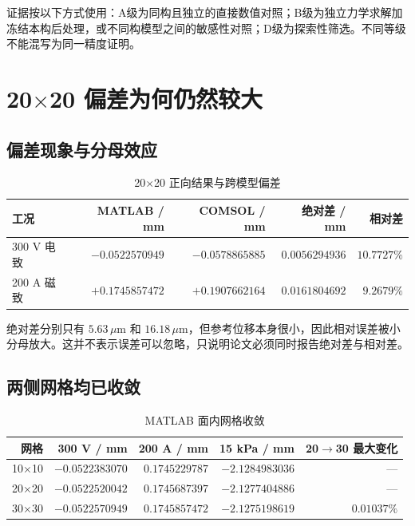 \documentclass[UTF8,fontset=windows,11pt,a4paper]{ctexart}
\begin{document}
证据按以下方式使用：A级为同构且独立的直接数值对照；B级为独立力学求解加冻结本构后处理，或不同构模型之间的敏感性对照；D级为探索性筛选。不同等级不能混写为同一精度证明。

\section{20$\times$20 偏差为何仍然较大}

\subsection{偏差现象与分母效应}

\begin{table}[H]
\centering
\caption{20$\times$20 正向结果与跨模型偏差}
\small
\begin{tabular}{lrrrr}
\toprule
工况 & MATLAB / mm & COMSOL / mm & 绝对差 / mm & 相对差 \\
\midrule
300 V 电致 & $-0.0522570949$ & $-0.0578865885$ & $0.0056294936$ & $10.7727\%$ \\
200 A 磁致 & $+0.1745857472$ & $+0.1907662164$ & $0.0161804692$ & $9.2679\%$ \\
\bottomrule
\end{tabular}
\end{table}

绝对差分别只有 $5.63\,\mu\mathrm{m}$ 和 $16.18\,\mu\mathrm{m}$，但参考位移本身很小，因此相对误差被小分母放大。这并不表示误差可以忽略，只说明论文必须同时报告绝对差与相对差。

\subsection{两侧网格均已收敛}

\begin{table}[H]
\centering
\caption{MATLAB 面内网格收敛}
\small
\begin{tabular}{rrrrr}
\toprule
网格 & 300 V / mm & 200 A / mm & 15 kPa / mm & 20$\to$30 最大变化 \\
\midrule
10$\times$10 & $-0.0522383070$ & $0.1745229787$ & $-2.1284983036$ & --- \\
20$\times$20 & $-0.0522520042$ & $0.1745687397$ & $-2.1277404886$ & --- \\
30$\times$30 & $-0.0522570949$ & $0.1745857472$ & $-2.1275198619$ & $0.01037\%$ \\
\bottomrule
\end{tabular}
\end{table}
\end{document}

